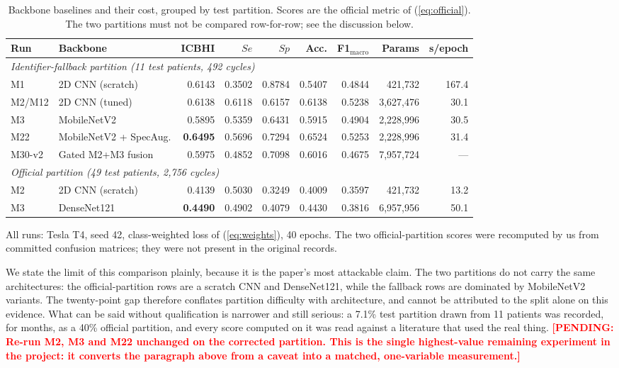 \documentclass[journal,onecolumn]{IEEEtran}
\newcommand{\pending}[1]{\textcolor{red}{\textbf{[PENDING: #1]}}}
\newcommand{\best}[1]{\textbf{#1}}
\begin{document}
\begin{table}[!t]
\centering
\caption{Backbone baselines and their cost, grouped by test partition. Scores are the
official metric of (\ref{eq:official}). The two partitions must not be compared
row-for-row; see the discussion below.}
\label{tab:baselines}
\begin{tabular}{llrrrrrrr}
\toprule
Run & Backbone & ICBHI & $Se$ & $Sp$ & Acc. & F1$_{\text{macro}}$ & Params & s/epoch \\
\midrule
\multicolumn{9}{l}{\emph{Identifier-fallback partition (11 test patients, 492 cycles)}}\\
M1     & 2D CNN (scratch)        & 0.6143 & 0.3502 & 0.8784 & 0.5407 & 0.4844 & 421{,}732   & 167.4 \\
M2/M12 & 2D CNN (tuned)          & 0.6138 & 0.6118 & 0.6157 & 0.6138 & 0.5238 & 3{,}627{,}476 & 30.1 \\
M3     & MobileNetV2             & 0.5895 & 0.5359 & 0.6431 & 0.5915 & 0.4904 & 2{,}228{,}996 & 30.5 \\
M22    & MobileNetV2 + SpecAug.  & \best{0.6495} & 0.5696 & 0.7294 & 0.6524 & 0.5253 & 2{,}228{,}996 & 31.4 \\
M30-v2 & Gated M2+M3 fusion      & 0.5975 & 0.4852 & 0.7098 & 0.6016 & 0.4675 & 7{,}957{,}724 & --- \\
\midrule
\multicolumn{9}{l}{\emph{Official partition (49 test patients, 2{,}756 cycles)}}\\
M2     & 2D CNN (scratch)        & 0.4139 & 0.5030 & 0.3249 & 0.4009 & 0.3597 & 421{,}732   & 13.2 \\
M3     & DenseNet121             & \best{0.4490} & 0.4902 & 0.4079 & 0.4430 & 0.3816 & 6{,}957{,}956 & 50.1 \\
\bottomrule
\end{tabular}

\vspace{2pt}
\footnotesize All runs: Tesla T4, seed 42, class-weighted loss of (\ref{eq:weights}),
40 epochs. The two official-partition scores were recomputed by us from committed
confusion matrices; they were not present in the original records.
\end{table}

We state the limit of this comparison plainly, because it is the paper's most
attackable claim. The two partitions do not carry the same architectures: the
official-partition rows are a scratch CNN and DenseNet121, while the fallback rows
are dominated by MobileNetV2 variants. The twenty-point gap therefore conflates
partition difficulty with architecture, and cannot be attributed to the split alone
on this evidence. What can be said without qualification is narrower and still
serious: a 7.1\% test partition drawn from 11 patients was recorded, for months, as a
40\% official partition, and every score computed on it was read against a literature
that used the real thing. \pending{Re-run M2, M3 and M22 unchanged on the corrected
partition. This is the single highest-value remaining experiment in the project: it
converts the paragraph above from a caveat into a matched, one-variable measurement.}
\end{document}
